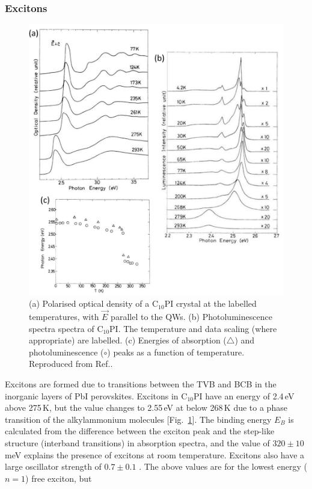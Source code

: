 \subsubsection{Excitons}
\begin{figure}[h!]
\centering
\includegraphics[width=\textwidth]{Fig13}
\caption{(a) Polarised optical density of a $\textrm{C}_{10}$PI crystal at the labelled temperatures, with $\vec{E}$ parallel to the QWs. (b) Photoluminescence spectra spectra of $\textrm{C}_{10}$PI. The temperature and data scaling (where appropriate) are labelled. (c) Energies of absorption ($\triangle$) and photoluminescence ($\circ$) peaks as a function of temperature. Reproduced from Ref.\!.}
\label{2Fig13}
\end{figure}
Excitons are formed due to transitions between the TVB and BCB in the inorganic layers of PbI perovskites. Excitons in $\textrm{C}_{10}$PI have an energy of 2.4\,eV above 275\,K, but the value changes to 2.55\,eV at below 268\,K due to a phase transition of the alkylammonium molecules [Fig.\ \ref{2Fig13}]. The binding energy $E_B$ is calculated from the difference between the exciton peak and the step-like structure (interband transitions) in absorption spectra, and the value of $320\pm10$\,meV explains the presence of excitons at room temperature. Excitons also have a large oscillator strength of $0.7\pm0.1$ \cite{Ishihara1990}. The above values are for the lowest energy ($n=1$) free exciton, but %
